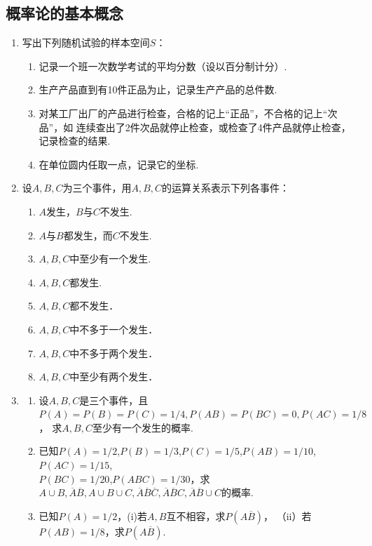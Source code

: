 \subsection{概率论的基本概念}
\begin{enumerate}
    
    \item 写出下列随机试验的样本空间$S$：
    \begin{enumerate}
        \item 记录一个班一次数学考试的平均分数（设以百分制计分）.
        \item 生产产品直到有10件正品为止，记录生产产品的总件数.
        \item 对某工厂出厂的产品进行检查，合格的记上“正品”，不合格的记上“次品”，如
        连续查出了2件次品就停止检查，或检查了4件产品就停止检查，记录检查的结果.
        \item 在单位圆内任取一点，记录它的坐标.
    \end{enumerate}



    \item 设$A,B,C$为三个事件，用$A,B,C$的运算关系表示下列各事件：
    \begin{enumerate}
        \item $A$发生，$B$与$C$不发生.
        \item $A$与$B$都发生，而$C$不发生.
        \item $A,B,C$中至少有一个发生.
        \item $A,B,C$都发生.
        \item $A,B,C$都不发生．
        \item $A,B,C$中不多于一个发生．
        \item $A,B,C$中不多于两个发生．
        \item $A,B,C$中至少有两个发生．
    \end{enumerate}



    \item \begin{enumerate}
        \item 设$A,B,C$是三个事件，且$P(A)=P(B)=P(C)=1/4,P(AB)=P(BC)=0,P(AC)=1/8$，
        求$A,B,C$至少有一个发生的概率.
        \item 已知$P(A)=1/2$,$P(B)=1/3$,$P(C)=1/5$,$P(AB)=1/10$,$P(AC)=1/15$,\\$P(BC)=1/20$,$P(ABC)=1/30$，求
        $A\cup B,\overline{A} \overline{B},A\cup B\cup C,\overline{A}\overline{B}\overline{C},\overline{A}\overline{B}C,\overline{A}\overline{B}\cup C$的概率.
        \item 已知$P(A)=1/2$，(i)若$A,B$互不相容，求$P(A\overline{B})$，
        （ii）若$P(AB)=1/8$，求$P(A\overline{B})$.
    \end{enumerate}



\end{enumerate}
